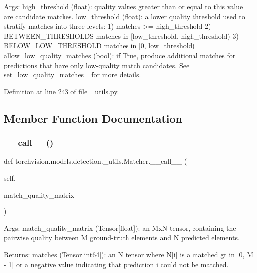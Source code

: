 \begin{DoxyVerb}Args:
    high_threshold (float): quality values greater than or equal to
this value are candidate matches.
    low_threshold (float): a lower quality threshold used to stratify
matches into three levels:
1) matches >= high_threshold
2) BETWEEN_THRESHOLDS matches in [low_threshold, high_threshold)
3) BELOW_LOW_THRESHOLD matches in [0, low_threshold)
    allow_low_quality_matches (bool): if True, produce additional matches
for predictions that have only low-quality match candidates. See
set_low_quality_matches_ for more details.
\end{DoxyVerb}
 

Definition at line 243 of file \+\_\+utils.\+py.



\subsection{Member Function Documentation}
\mbox{\label{classtorchvision_1_1models_1_1detection_1_1__utils_1_1Matcher_ae4210fa2c8d4723d8749bf30ab5bb1b7}} 
\subsubsection{\texorpdfstring{\+\_\+\+\_\+call\+\_\+\+\_\+()}{\_\_call\_\_()}}
{\footnotesize\ttfamily def torchvision.\+models.\+detection.\+\_\+utils.\+Matcher.\+\_\+\+\_\+call\+\_\+\+\_\+ (\begin{DoxyParamCaption}\item[{}]{self,  }\item[{}]{match\+\_\+quality\+\_\+matrix }\end{DoxyParamCaption})}

\begin{DoxyVerb}Args:
    match_quality_matrix (Tensor[float]): an MxN tensor, containing the
    pairwise quality between M ground-truth elements and N predicted elements.

Returns:
    matches (Tensor[int64]): an N tensor where N[i] is a matched gt in
    [0, M - 1] or a negative value indicating that prediction i could not
    be matched.
\end{DoxyVerb}
 


